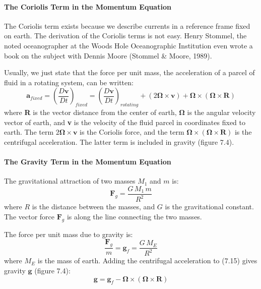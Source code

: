 \paragraph{The Coriolis Term in the Momentum Equation}
The
Coriolis term exists because we describe currents in a reference frame
fixed on earth. The derivation of the Coriolis terms is not
easy. Henry Stommel, the noted oceanographer at the Woods Hole
Oceanographic Institution even wrote a book on the subject with Dennis
Moore (Stommel \& Moore, 1989).

Usually, we just state that the force per unit mass, the acceleration
of a parcel of fluid in a rotating system, can be written:
\begin{equation}
\textbf{a}_{fixed} = \left(\frac{D\textbf{v}}{Dt}\right)_{fixed} =
 \left(\frac{D\textbf{v}}{Dt}\right)_{rotating} + \left( 2 \boldsymbol{\Omega}
\times \mathbf{v} \right) + \boldsymbol{\Omega} \times \left(
\boldsymbol{\Omega} \times \mathbf{R} \right)
\end{equation}
where \textbf{R} is the vector distance from the center of earth,
$\boldsymbol{\Omega}$ is the angular velocity vector of earth, and
\textbf{v} is the velocity of the fluid parcel in coordinates fixed to
earth.  The term $2 \boldsymbol{\Omega} \times \mathbf{v}$ is the
Coriolis force, and the term $\boldsymbol{\Omega} \times \left(
\boldsymbol{\Omega} \times \mathbf{R} \right)$ is the centrifugal
acceleration. The latter term is included in gravity (figure 7.4).

\paragraph{The Gravity Term in the Momentum Equation}
The gravitational attraction of
two masses $M_1$ and $m$ is:
\begin{displaymath}
\textbf{F}_g = \frac{G\,M_1\, m}{R^2}
\end{displaymath}
where $R$ is the distance between the masses, and $G$ is the
gravitational constant. The vector force $\textbf{F}_g$ is along the
line connecting the two masses.

The force per unit mass due to gravity is:
\begin{equation}
\frac{\textbf{F}_g}{m} = \textbf{g}_f =\frac{G\,M_E}{R^2}
\end{equation}
where $M_E$ is the mass of earth. Adding the centrifugal acceleration
to (7.15) gives gravity $\textbf{g}$ (figure 7.4):
\begin{equation}
\textbf{g} = \textbf{g}_f - \boldsymbol{\Omega} \times
\left( \boldsymbol{\Omega} \times \mathbf{R}
\right)
\end{equation}

